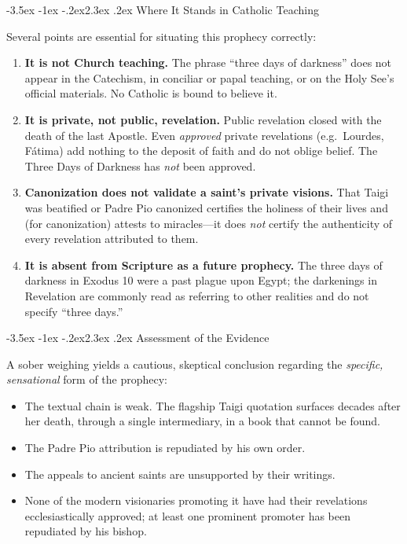 \documentclass[11pt]{article}
\makeatletter
\renewcommand\section{\@startsection{section}{1}{\z@}%
  {-3.5ex \@plus -1ex \@minus -.2ex}{2.3ex \@plus.2ex}%
  {\normalfont\Large\bfseries\color{accent}}}
\makeatother
\begin{document}
\section{Where It Stands in Catholic Teaching}

Several points are essential for situating this prophecy correctly:

\begin{enumerate}
  \item \textbf{It is not Church teaching.} The phrase ``three days of
        darkness'' does not appear in the Catechism, in conciliar or papal
        teaching, or on the Holy See's official materials. No Catholic is
        bound to believe it.

  \item \textbf{It is private, not public, revelation.} Public revelation
        closed with the death of the last Apostle. Even \emph{approved}
        private revelations (e.g.\ Lourdes, F\'atima) add nothing to the
        deposit of faith and do not oblige belief. The Three Days of Darkness
        has \emph{not} been approved.

  \item \textbf{Canonization does not validate a saint's private visions.}
        That Taigi was beatified or Padre Pio canonized certifies the holiness
        of their lives and (for canonization) attests to miracles---it does
        \emph{not} certify the authenticity of every revelation attributed to
        them.

  \item \textbf{It is absent from Scripture as a future prophecy.} The three
        days of darkness in Exodus 10 were a past plague upon Egypt; the
        darkenings in Revelation are commonly read as referring to other
        realities and do not specify ``three days.''
\end{enumerate}

\section{Assessment of the Evidence}

A sober weighing yields a cautious, skeptical conclusion regarding the
\emph{specific, sensational} form of the prophecy:

\begin{itemize}
  \item The textual chain is weak. The flagship Taigi quotation surfaces
        decades after her death, through a single intermediary, in a book that
        cannot be found.
  \item The Padre Pio attribution is repudiated by his own order.
  \item The appeals to ancient saints are unsupported by their writings.
  \item None of the modern visionaries promoting it have had their revelations
        ecclesiastically approved; at least one prominent promoter has been
        repudiated by his bishop.
\end{itemize}
\end{document}
